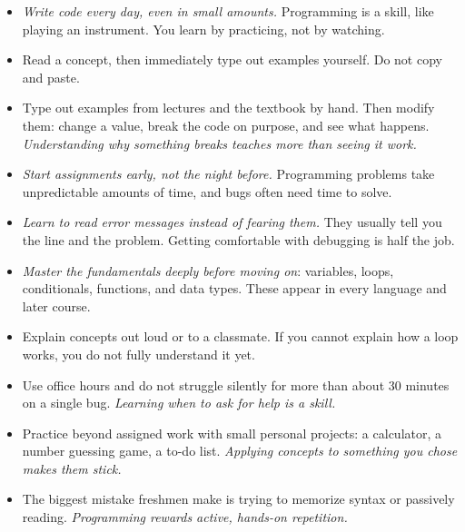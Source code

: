 \documentclass[%
 reprint,
 amsmath,amssymb,
 aps,
]{revtex4-2}
\begin{document}
\begin{itemize}
	
	\item
	\emph{Write code every day, even in small amounts.} 
	Programming is a skill, like playing an instrument. 
	You learn by practicing, not by watching.
	
	\item
	Read a concept, then immediately type out examples yourself. 
	Do not copy and paste.
	
	\item
	Type out examples from lectures and the textbook by hand. 
	Then modify them: change a value, break the code on purpose, and see what happens. 
	\emph{Understanding why something breaks teaches more than seeing it work.}
	
	\item
	\emph{Start assignments early, not the night before.} 
	Programming problems take unpredictable amounts of time, and bugs often need time to solve.
	
	\item
	\emph{Learn to read error messages instead of fearing them.} 
	They usually tell you the line and the problem. 
	Getting comfortable with debugging is half the job.
	
	\item
	\emph{Master the fundamentals deeply before moving on}: 
	variables, loops, conditionals, functions, and data types. 
	These appear in every language and later course.
	
	\item
	Explain concepts out loud or to a classmate. 
	If you cannot explain how a loop works, you do not fully understand it yet.
	
	\item
	Use office hours and do not struggle silently for more than about 30 minutes on a single bug. 
	\emph{Learning when to ask for help is a skill.}
	
	\item
	Practice beyond assigned work with small personal projects: 
	a calculator, a number guessing game, a to-do list. 
	\emph{Applying concepts to something you chose makes them stick.}
	
	\item
	The biggest mistake freshmen make is trying to memorize syntax or passively reading. 
	\emph{Programming rewards active, hands-on repetition.}

\end{itemize}
\end{document}
